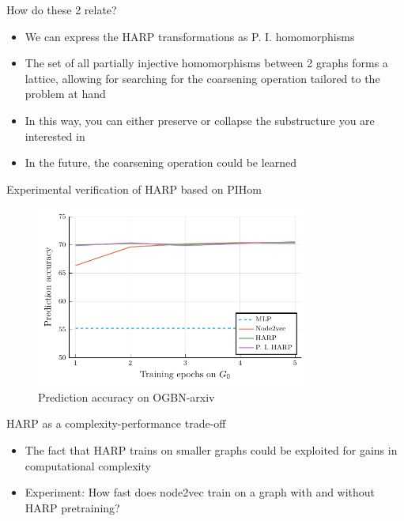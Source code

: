 \documentclass[10pt]{beamer}
\begin{document}
\begin{frame}{How do these 2 relate?}
	\begin{itemize}
		\item We can express the HARP transformations as P. I. homomorphisms
		\item The set of all partially injective homomorphisms between 2 graphs forms a lattice, allowing for searching for the coarsening operation tailored to the problem at hand
		\item In this way, you can either preserve or collapse the substructure you are interested in
		\item In the future, the coarsening operation could be learned
	\end{itemize}
\end{frame}

\begin{frame}{Experimental verification of HARP based on PIHom}
	\begin{figure}
		\centering
		\includegraphics[width=0.8\textwidth]{images/pihom_comparison/pihom_comparison.pdf}
		\caption{Prediction accuracy on OGBN-arxiv}
	\end{figure}
\end{frame}

\begin{frame}{HARP as a complexity-performance trade-off}
	\begin{itemize}
		\item The fact that HARP trains on smaller graphs could be exploited for gains in computational complexity
		\item Experiment: How fast does node2vec train on a graph with and without HARP pretraining?
	\end{itemize}
\end{frame}
\end{document}

